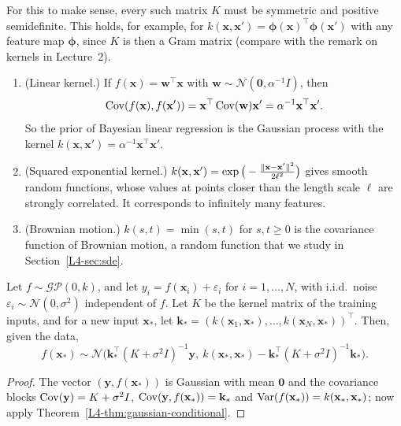 For this to make sense, every such matrix $K$ must be symmetric and positive semidefinite. This holds, for example, for $k(\mathbf{x}, \mathbf{x}') = \boldsymbol{\phi}(\mathbf{x})^\top\boldsymbol{\phi}(\mathbf{x}')$ with any feature map $\boldsymbol{\phi}$, since $K$ is then a Gram matrix (compare with the remark on kernels in Lecture~2).

\begin{example}\label{L4-ex:kernels}
    \begin{enumerate}
        \item (Linear kernel.) If $f(\mathbf{x}) = \mathbf{w}^\top\mathbf{x}$ with $\mathbf{w} \sim \mathcal{N}(\mathbf{0}, \alpha^{-1}I)$, then
        \[\operatorname{Cov}(f(\mathbf{x}), f(\mathbf{x}')) = \mathbf{x}^\top\operatorname{Cov}(\mathbf{w})\mathbf{x}' = \alpha^{-1}\mathbf{x}^\top\mathbf{x}'.\]
        So the prior of Bayesian linear regression is the Gaussian process with the kernel $k(\mathbf{x}, \mathbf{x}') = \alpha^{-1}\mathbf{x}^\top\mathbf{x}'$.
        \item (Squared exponential kernel.) $k(\mathbf{x}, \mathbf{x}') = \exp\big(-\frac{\lVert \mathbf{x} - \mathbf{x}' \rVert^2}{2\ell^2}\big)$ gives smooth random functions, whose values at points closer than the length scale $\ell$ are strongly correlated. It corresponds to infinitely many features.
        \item (Brownian motion.) $k(s, t) = \min(s, t)$ for $s, t \geq 0$ is the covariance function of Brownian motion, a random function that we study in Section~\ref{L4-sec:sde}.
    \end{enumerate}
\end{example}

\begin{proposition}\label{L4-prop:gp-regression}
    Let $f \sim \mathcal{GP}(0, k)$, and let $y_i = f(\mathbf{x}_i) + \varepsilon_i$ for $i = 1, \ldots, N$, with i.i.d.\ noise $\varepsilon_i \sim \mathcal{N}(0, \sigma^2)$ independent of $f$. Let $K$ be the kernel matrix of the training inputs, and for a new input $\mathbf{x}_*$, let $\mathbf{k}_* = (k(\mathbf{x}_1, \mathbf{x}_*), \ldots, k(\mathbf{x}_N, \mathbf{x}_*))^\top$. Then, given the data,
    \[f(\mathbf{x}_*) \sim \mathcal{N}\big(\mathbf{k}_*^\top(K + \sigma^2 I)^{-1}\mathbf{y}, \ k(\mathbf{x}_*, \mathbf{x}_*) - \mathbf{k}_*^\top(K + \sigma^2 I)^{-1}\mathbf{k}_*\big).\]
\end{proposition}

\begin{proof}
    The vector $(\mathbf{y}, f(\mathbf{x}_*))$ is Gaussian with mean $\mathbf{0}$ and the covariance blocks $\operatorname{Cov}(\mathbf{y}) = K + \sigma^2 I$, $\operatorname{Cov}(\mathbf{y}, f(\mathbf{x}_*)) = \mathbf{k}_*$ and $\operatorname{Var}(f(\mathbf{x}_*)) = k(\mathbf{x}_*, \mathbf{x}_*)$; now apply Theorem~\ref{L4-thm:gaussian-conditional}.
\end{proof}

